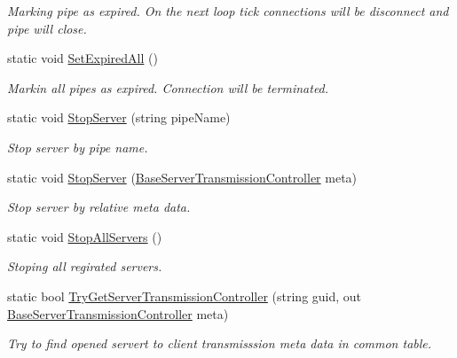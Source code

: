 \begin{DoxyCompactItemize}
\begin{DoxyCompactList}\small\item\em Marking pipe as expired. On the next loop tick connections will be disconnect and pipe will close. \end{DoxyCompactList}\item 
static void \mbox{\hyperlink{class_pipes_provider_1_1_server_1_1_server_a_p_i_a6d6f42c39e7f5c8a63a026739fe0ea94}{Set\+Expired\+All}} ()
\begin{DoxyCompactList}\small\item\em Markin all pipes as expired. Connection will be terminated. \end{DoxyCompactList}\item 
static void \mbox{\hyperlink{class_pipes_provider_1_1_server_1_1_server_a_p_i_af9c612e584b125b1fdc2c32490613bb1}{Stop\+Server}} (string pipe\+Name)
\begin{DoxyCompactList}\small\item\em Stop server by pipe name. \end{DoxyCompactList}\item 
static void \mbox{\hyperlink{class_pipes_provider_1_1_server_1_1_server_a_p_i_a8a70cec80dfb54ff68d8c4924a8b4007}{Stop\+Server}} (\mbox{\hyperlink{class_pipes_provider_1_1_server_1_1_transmission_controllers_1_1_base_server_transmission_controller}{Base\+Server\+Transmission\+Controller}} meta)
\begin{DoxyCompactList}\small\item\em Stop server by relative meta data. \end{DoxyCompactList}\item 
static void \mbox{\hyperlink{class_pipes_provider_1_1_server_1_1_server_a_p_i_a44469667416cb072d8fd258b299a53cd}{Stop\+All\+Servers}} ()
\begin{DoxyCompactList}\small\item\em Stoping all regirated servers. \end{DoxyCompactList}\item 
static bool \mbox{\hyperlink{class_pipes_provider_1_1_server_1_1_server_a_p_i_a6fba1adf18ce5938c6edcb29f28adfe5}{Try\+Get\+Server\+Transmission\+Controller}} (string guid, out \mbox{\hyperlink{class_pipes_provider_1_1_server_1_1_transmission_controllers_1_1_base_server_transmission_controller}{Base\+Server\+Transmission\+Controller}} meta)
\begin{DoxyCompactList}\small\item\em Try to find opened servert to client transmisssion meta data in common table. \end{DoxyCompactList}\end{DoxyCompactItemize}
